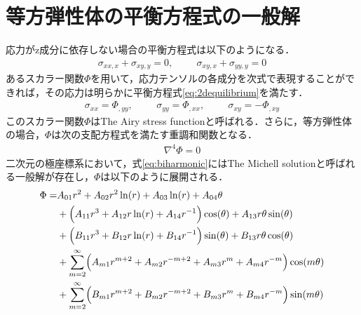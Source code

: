 \section{等方弾性体の平衡方程式の一般解}

応力がz成分に依存しない場合の平衡方程式は以下のようになる．
\begin{align}
\sigma_{xx,x}+\sigma_{xy,y}=0,\hspace{1cm}\sigma_{xy,x}+\sigma_{yy,y}=0
\label{eq:2dequilibrium}
\end{align}
あるスカラー関数$\Phi$を用いて，応力テンソルの各成分を次式で表現することができれば，その応力は明らかに平衡方程式\eqref{eq:2dequilibrium}を満たす．
\begin{align}
\sigma_{xx}=\Phi_{,yy},\hspace{1cm}\sigma_{yy}=\Phi_{,xx},\hspace{1cm}\sigma_{xy}=-\Phi_{,xy}
\label{eq:Airyxy}
\end{align}
このスカラー関数$\Phi$はThe Airy stress functionと呼ばれる．さらに，等方弾性体の場合，$\Phi$は次の支配方程式を満たす重調和関数となる．
\begin{align}
\nabla^4\Phi=0
\label{eq:biharmonic}
\end{align}
二次元の極座標系において，式\eqref{eq:biharmonic}にはThe Michell solutionと呼ばれる一般解が存在し，$\Phi$は以下のように展開される．
\begin{align}
\Phi =&A_{01}r^2+A_{02}r^2\ln(r)+A_{03}\ln(r)+A_{04}\theta
\nonumber
\\
&+\Bigl(A_{11}r^3+A_{12}r\ln(r)+A_{14}r^{-1}\Bigr)\cos(\theta)+A_{13}r\theta\sin(\theta)
\nonumber
\\
&+\Bigl(B_{11}r^3+B_{12}r\ln(r)+B_{14}r^{-1}\Bigr)\sin(\theta)+B_{13}r\theta\cos(\theta)
\nonumber
\\
&+\sum_{m=2}^{\infty}\Bigl(A_{m1}r^{m+2}+A_{m2}r^{-m+2}
+A_{m3}r^{m}+A_{m4}r^{-m}\Bigr)\cos(m\theta)
\nonumber
\\
&+\sum_{m=2}^{\infty}\Bigl(B_{m1}r^{m+2}+B_{m2}r^{-m+2}
+B_{m3}r^{m}+B_{m4}r^{-m}\Bigr)\sin(m\theta)
\label{eq:Michell}
\end{align}

